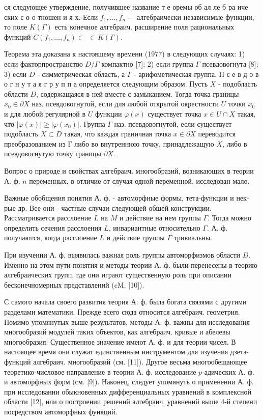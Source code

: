 \documentclass[10pt]{article}
\begin{document}
ся следующее утверждение, получившее название т е оремы об ал ле б ра иче ских с о о тношен и я х. Если $f_{1}, \ldots, f_{n}-$ алгебраически независимые функции, то поле $K(\Gamma)$ есть конечное алгебраич. расширение поля рациональных функций $C\left(f_{1}, \ldots, f_{n}\right) \subset$ $\subset K(\Gamma)$.



Теорема эта доказана к настоящему времени (1977) в следующих случаях: 1) если факторпространство $D / \Gamma$ компактно [7]; 2) если группа $\Gamma$ псевдовогнута [8]; 3) если $D$ - симметрическая область, а $\Gamma$ - арифометическая группа. П с е в д о в о г н у т а я г р у п п а определяется следующим образом. Пусть $X$ - подобласть области $D$, содержащаяся в ней вместе с замыканием. Тогда точка границы $x_{0} \in \partial X$ наз. псевдовогнутой, если для любой открытой окрестности $U$ точки $x_{0}$ и для любой регулярной в $U$ функции $\varphi(x)$ существует точка $x \in U \cap X$ такая, что $|\varphi(x)| \geqslant\left|\varphi\left(x_{0}\right)\right|$. Группа $\Gamma$ наз. псевдовогнутой, если существует подобласть $X \subset D$ такая, что каждая граничная точка $x \in \partial X$ переводится преобразованием из Г либо во внутреннюю точку, принадлежащую $X$, либо в псевдовогнутую точку границы $\partial X$.



Вопрос о природе и свойствах алгебраич. многообразий, возникающих в теории А. ф. $n$ переменных, в отличие от случая одной переменной, исследован мало.



Важные обобщения понятия А. ф. - автоморфные формы, тета-функции и нек-рые др. Все они - частные случаи следующей общей конструкции. Рассматривается расслоение $L$ на $M$ и действие на нем группы $\Gamma$. Тогда можно определить сечения расслоения $L$, инвариантные относительно $\Gamma$. А. ф. получаются, когда расслоение $L$ и действие группы $\Gamma$ тривиальны.



При изучении А. ф. выявилась важная роль группы автоморфизмов области $D$. Именно на этом пути понятия и методы теории А. ф. были перенесены в теорию алгебраических групп, где они играют существенную роль при описании бесконечномерных представлений (cM. [10]).



С самого начала своего развития теория А. ф. была богата связями с другими разделами математики. Прежде всего сюда относится алгебраич. геометрия. Помимо упомянутых выше результатов, методы А. ф. важны для исследования многообразий модулей таких объектов, как алгебраич. кривые и абелевы многообразия: Существенное значение имеют А. ф. и для теории чисел. В настоящее время они служат единственным инструментом для изучения дзета-функций алгебраич. многообразий (см. [11]). Другое весьма многообещающее теоретико-числовое направление в теории А. ф. исследование $p$-адических А. ф. и автоморфных форм (см. [9]). Наконец, следует упомянуть о применении А. ф. при исследовании обыкновенных дифференциальных уравнений в комплексной области [12], или о построении решений алгебраич. уравнений выше 4-й степени посредством автоморфных функций.
\end{document}
